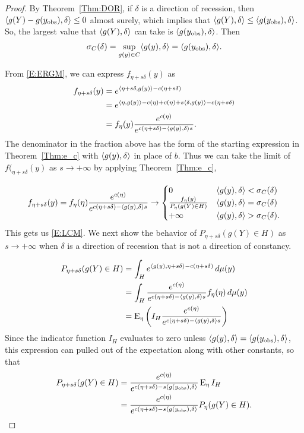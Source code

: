 \begin{proof}
By Theorem~\ref{Thm:DOR}, if $\delta$ is a direction of recession, then 
$\langle g(Y) - g(y_{\text{obs}}), \delta \rangle \leq 0$ almost surely, which implies 
that $\langle g(Y), \delta \rangle \leq \langle g(y_{\text{obs}}), \delta \rangle$.  
So, the largest value that $\langle g(Y), \delta \rangle$ can take is 
$\langle g(y_{\text{obs}}), \delta \rangle$.  Then 
\begin{align*}
\sigma_C(\delta) = \sup_{g(y) \in C}\langle g(y), \delta \rangle = 
\langle g(y_{\text{obs}}), \delta \rangle.
\end{align*}

From \eqref{E:ERGM}, we can express $f_{\eta+s\delta}(y)$ as
\begin{align*}
 f_{\eta+s\delta}(y) &= e^{ \langle \eta+s\delta,g(y) \rangle - c(\eta+s\delta)  } \\
 &= e^{ \langle \eta,g(y) \rangle -c(\eta)+c(\eta) + s\langle \delta,g(y) \rangle - c(\eta+s\delta) } \\
 	&= f_\eta(y) \frac{e^{c(\eta)}}{e^{ c(\eta+s\delta) - \langle g(y),\delta \rangle
s } }.
\end{align*}
The denominator in the fraction above has the form of the starting expression in 
Theorem~\ref{Thm:e_c} with $\langle g(y),\delta \rangle$ in place of $b$.
Thus we can take the limit of $f(_{\eta+s\delta}(y)$ as
$s \to +\infty$ by applying Theorem~\ref{Thm:e_c},

\begin{align*}
	f_{\eta+s\delta}(y) = f_\eta(\eta) \frac{e^{c(\eta)}}{e^{ c(\eta+s
\delta) - \langle g(y),\delta \rangle s } } 
	\to	
			\begin{cases} 
			0 					& \langle g(y),\delta \rangle < \sigma_C(\delta) \\
			\frac{f_\eta(y)}{P_\eta(g(Y) \in H)} 	& 
								\langle g(y),\delta \rangle = \sigma_C(\delta) \\
			+\infty				& \langle g(y),\delta \rangle > \sigma_C(\delta).
			\end{cases}
\end{align*}
This gets us \eqref{E:LCM}.  We next show the behavior of 
$P_{\eta+s\delta}(g(Y) \in H)$ as $s \to +\infty$ when $\delta$ is a direction of
recession that is not a direction of constancy.

\begin{align*}
 P_{\eta+s\delta}(g(Y) \in H) &= \int_H e^{\langle g(y), \eta+s\delta \rangle - c(\eta
+s\delta)} \, d\mu(y) \\
		&= \int_H  \frac{e^{c(\eta)}}{e^{c(\eta+s\delta)-\langle g(y),\delta \rangle s}} 
					f_\eta(\eta) \, d\mu(y)\\
		&= \operatorname{E}_\eta  \left ( I_H \frac{e^{c(\eta)}}{e^{c(\eta+s\delta)-\langle g(y),\delta \rangle s}} \right )
\end{align*}
Since the indicator function $I_H$ evaluates to zero unless 
$\langle  g(y), \delta \rangle = \langle  g(y_{\text{obs}}), \delta \rangle $,  
this expression can pulled out of the expectation along with other constants, so that 
\begin{align*}
		 P_{\eta+s\delta}(g(Y) \in H)
		 &= \frac{e^{c(\eta)} }{ e^{ c(\eta+s\delta) -s\langle g(y_{\text{obs}}),\delta \rangle } }
		 \operatorname{E}_\eta  I_H   \\
		 &= \frac{e^{c(\eta)} }{ e^{ c(\eta+s\delta) -s\langle g(y_{\text{obs}}),\delta \rangle } }
		 P_\eta  (g(Y) \in H). 
		 \end{align*}
 

\end{proof}
